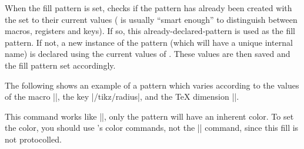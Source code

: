 \begin{command}{\pgfdeclarepatternformonly%
}
    When the fill pattern is set, \pgfname{} checks if the pattern has already
    been created with the  set to their current values
    (\pgfname{} is usually ``smart enough'' to distinguish between macros,
    registers and keys). If so, this already-declared-pattern is used as the
    fill pattern. If not, a new instance of the pattern (which will have a
    unique internal name) is declared using the current values of
    . These values are then saved and the fill pattern set
    accordingly.

    The following shows an example of a pattern which varies according to the
    values of the macro |\size|, the key |/tikz/radius|, and the \TeX{}
    dimension |\thickness|.
\begin{codeexample}[]
{}
{}
{\pgfpoint{\size}{\size}}
{
  \pgfsetlinewidth{\thickness}
  \pgfpathcircle{}
}
\newdimen\thickness
{}
\end{codeexample}
\end{command}

\begin{command}{\pgfdeclarepatterninherentlycolored
}
    This command works like |\pgfdeclarepatternuncolored|, only the pattern
    will have an inherent color. To set the color, you should use \pgfname's
    color commands, not the |\color| command, since this fill is not
    protocolled.
\begin{codeexample}[]
{\pgfpointorigin}{\pgfpoint{1cm}{1cm}}
{\pgfpoint{1cm}{1cm}}
{
  \pgftransformshift{\pgfpoint{.5cm}{.5cm}}
  \pgfpathclose%
}
\end{codeexample}
\end{command}


